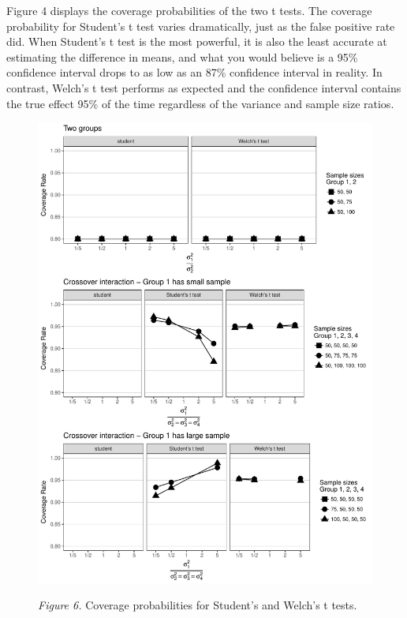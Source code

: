 \documentclass[man, noextraspace, apacite, floatsintext]{apa6}
\begin{document}
Figure 4 displays the coverage probabilities of the two t tests. 
The coverage probability for Student's t test varies dramatically, just as the 
false positive rate did.  When Student's t test is the most 
powerful, it is also the least accurate at estimating the difference in means, and what you would believe is a 95\% 
confidence interval drops to as low as an 87\% confidence interval in reality. 
In contrast, Welch's t test performs as expected and the confidence interval 
contains the true effect 95\% of the time regardless of the variance and sample 
size ratios. 


\begin{figure}[!ht]
\includegraphics{WelchManuscript-MASTER-CoveragePlots}

\textit{Figure 6.} Coverage probabilities for Student's and Welch's t tests.
\end{figure}
\end{document}
